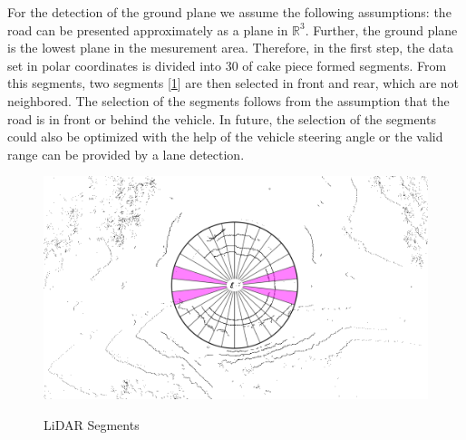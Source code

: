 \documentclass[11pt,oneside,openright]{mpreport}
\begin{document}

For the detection of the ground plane we assume the following assumptions: the road can be presented approximately as a plane in $\mathbb{R}^3$.
Further, the ground plane is the lowest plane in the mesurement area. Therefore, in the first step, the data set in polar coordinates is divided into 30 of cake piece formed segments.
From this segments, two segments [\cref{segments}] are then selected in front and rear, which are not neighbored. The selection of the segments follows from the assumption
that the road is in front or behind the vehicle. In future, the selection of the segments could also be optimized with the help of the vehicle steering angle 
or the valid range can be provided by a lane detection.

\begin{figure}[!ht]
\caption{LiDAR Segments}
\includegraphics[width=\textwidth]{bilder/segments.png}
\label{segments}
\end{figure}
\end{document}
